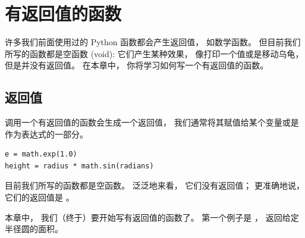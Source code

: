 
\chapter{有返回值的函数}
\label{fruitchap}


许多我们前面使用过的 Python 函数都会产生返回值， 如数学函数。
但目前我们所写的函数都是空函数 (void): 它们产生某种效果， 像打印一个值或是移动乌龟，但是并没有返回值。
在本章中， 你将学习如何写一个有返回值的函数。

\section{返回值}
  


调用一个有返回值的函数会生成一个返回值， 我们通常将其赋值给某个变量或是作为表达式的一部分。

\begin{lstlisting}
e = math.exp(1.0)
height = radius * math.sin(radians)
\end{lstlisting}

%

目前我们所写的函数都是空函数。
泛泛地来看， 它们没有返回值； 更准确地说， 它们的返回值是  。


本章中， 我们（终于）要开始写有返回值的函数了。
第一个例子是  ， 返回给定半径圆的面积。

